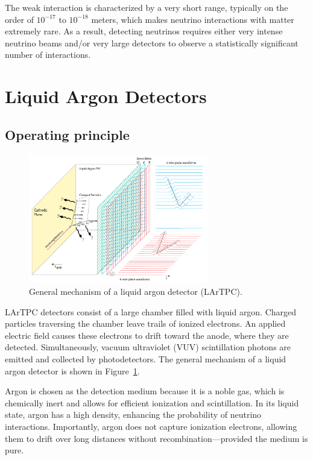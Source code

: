 \documentclass{pracalicmgr}
\begin{document}
The weak interaction is characterized by a very short range, typically on the order of $10^{-17}$ to $10^{-18}$ meters\cite{WeakInteraction}, which makes neutrino interactions with matter extremely rare. As a result, detecting neutrinos requires either very intense neutrino beams and/or very large detectors to observe a statistically significant number of interactions.

\section{Liquid Argon Detectors}

\subsection{Operating principle}

\begin{figure}[H]
    \centering
    \includegraphics[width=0.7\textwidth]{src/LAr_diagram_DUNE.png}
    \caption{General mechanism of a liquid argon detector (LArTPC).\cite{MicroBooNEDesign}}
    \label{fig:lartcp}
\end{figure}

LArTPC detectors consist of a large chamber filled with liquid argon. Charged particles traversing the chamber leave trails of ionized electrons. An applied electric field causes these electrons to drift toward the anode, where they are detected. Simultaneously, vacuum ultraviolet (VUV) scintillation photons are emitted and collected by photodetectors. The general mechanism of a liquid argon detector is shown in Figure~\ref{fig:lartcp}.

Argon is chosen as the detection medium because it is a noble gas, which is chemically inert and allows for efficient ionization and scintillation. In its liquid state, argon has a high density, enhancing the probability of neutrino interactions. Importantly, argon does not capture ionization electrons, allowing them to drift over long distances without recombination—provided the medium is pure.
\end{document}
